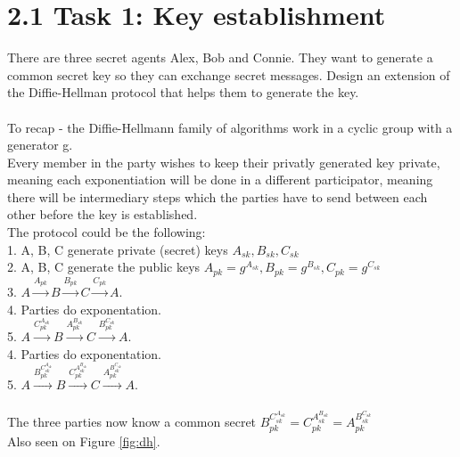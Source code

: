 \documentclass{article}
\begin{document}
\section{2.1 Task 1:  Key establishment} %
There are three secret agents Alex, Bob and Connie. They want to generate a common secret key so they can exchange secret
messages. Design an extension of the Diffie-Hellman protocol that helps them to generate the key.
\\\\
To recap - the Diffie-Hellmann family of algorithms work in a cyclic group with a generator g.
\\
Every member in the party wishes to keep their privatly generated key private, meaning each exponentiation
will be done in a different participator, meaning there will be intermediary steps which the parties have 
to send between each other before the key is established. 
\\
The protocol could be the following:\\
1. A, B, C generate private (secret) keys $A_{sk}, B_{sk}, C_{sk}$ \\
2. A, B, C generate the public keys $A_{pk} = g^{A_{sk}}, B_{pk} = g^{B_{sk}}, C_{pk} = g^{C_{sk}}$\\
3. $A \xrightarrow{A_{pk}} B \xrightarrow{B_{pk}} C \xrightarrow{C_{pk}} A$.\\
4. Parties do exponentation.\\
5. $A \xrightarrow{C_{pk}^{A_{sk}}} B \xrightarrow{A_{pk}^{B_{sk}}} C \xrightarrow{B_{pk}^{C_{sk}}} A$.\\
4. Parties do exponentation.\\
5. $A \xrightarrow{{B_{pk}^{C_{sk}^{A_{sk}}}}} B \xrightarrow{C_{pk}^{A_{sk}^{B_{sk}}}} C \xrightarrow{A_{pk}^{B_{sk}^{C_{sk}}}} A$.\\
\\The three parties now know a common secret ${B_{pk}^{C_{sk}^{A_{sk}}}} = C_{pk}^{A_{sk}^{B_{sk}}} = A_{pk}^{B_{sk}^{C_{sk}}}$
\\Also seen on Figure \ref{fig:dh}.
\\\\
\end{document}
